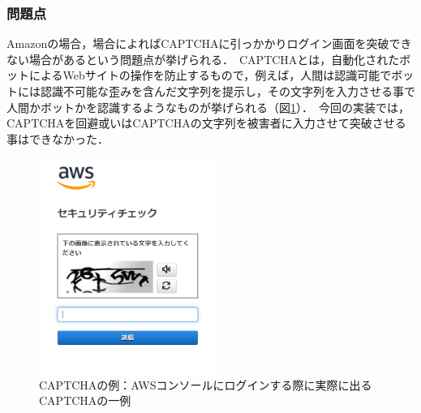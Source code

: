 \documentclass[dvipdfmx]{jsarticle}
\begin{document}
                \subsubsection{問題点}
                    Amazonの場合，場合によればCAPTCHAに引っかかりログイン画面を突破できない場合があるという問題点が挙げられる．\
                    CAPTCHAとは，自動化されたボットによるWebサイトの操作を防止するもので，例えば，人間は認識可能でボットには認識不可能な歪みを含んだ文字列を提示し，その文字列を入力させる事で人間かボットかを認識するようなものが挙げられる（図\ref{captcha}）．\
                    今回の実装では，CAPTCHAを回避或いはCAPTCHAの文字列を被害者に入力させて突破させる事はできなかった．\
                    \begin{figure}[pth]
                        \centering
                        \includegraphics[height=7cm]{img/captcha.png}
                        \caption{CAPTCHAの例：AWSコンソールにログインする際に実際に出るCAPTCHAの一例}
                        \label{captcha}
                    \end{figure}
                    \clearpage
\end{document}
